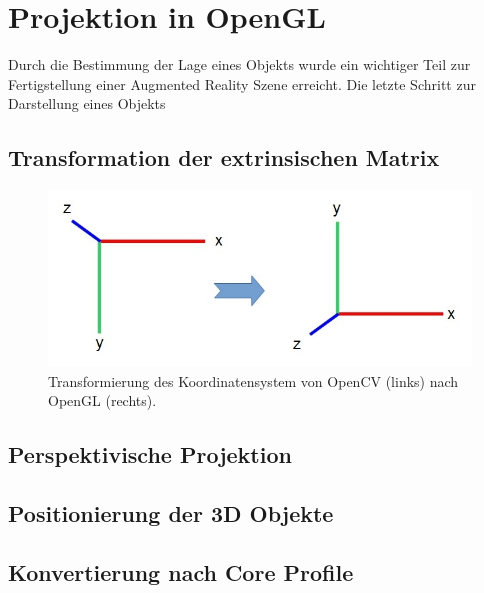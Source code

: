 
\chapter{Projektion in OpenGL}

Durch die Bestimmung der Lage eines Objekts wurde ein wichtiger Teil zur Fertigstellung einer Augmented Reality Szene erreicht. Die letzte Schritt zur Darstellung eines Objekts 

\section{Transformation der extrinsischen Matrix}

\begin{figure}[!ht]
\centering
\includegraphics[scale=0.5]{images/opencv-to-opengl.jpg} 
\caption{Transformierung des Koordinatensystem von OpenCV (links) nach OpenGL (rechts).}
\label{fig:opencv-to-opengl}
\end{figure}


\section{Perspektivische Projektion}

\section{Positionierung der 3D Objekte}

\section{Konvertierung nach Core Profile}